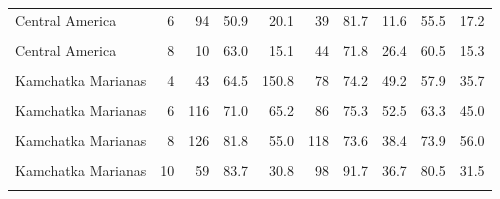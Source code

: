 \begin{ThreePartTable}
\begin{longtable}[t]{lrrrrrrrrr}
Central America & 6 & 94 & 50.9 & 20.1 & 39 & 81.7 & 11.6 & 55.5 & 17.2\\
\cellcolor{gray!6}{Central America} & \cellcolor{gray!6}{7} & \cellcolor{gray!6}{2} & \cellcolor{gray!6}{76.4} & \cellcolor{gray!6}{11.5} & \cellcolor{gray!6}{48} & \cellcolor{gray!6}{81.5} & \cellcolor{gray!6}{11.1} & \cellcolor{gray!6}{65.0} & \cellcolor{gray!6}{9.8}\\
Central America & 8 & 10 & 63.0 & 15.1 & 44 & 71.8 & 26.4 & 60.5 & 15.3\\
\cellcolor{gray!6}{Kamchatka Marianas} & \cellcolor{gray!6}{3} & \cellcolor{gray!6}{25} & \cellcolor{gray!6}{186.0} & \cellcolor{gray!6}{112.0} & \cellcolor{gray!6}{81} & \cellcolor{gray!6}{70.4} & \cellcolor{gray!6}{44.1} & \cellcolor{gray!6}{53.3} & \cellcolor{gray!6}{46.4}\\
Kamchatka Marianas & 4 & 43 & 64.5 & 150.8 & 78 & 74.2 & 49.2 & 57.9 & 35.7\\
\cellcolor{gray!6}{Kamchatka Marianas} & \cellcolor{gray!6}{5} & \cellcolor{gray!6}{79} & \cellcolor{gray!6}{54.0} & \cellcolor{gray!6}{64.5} & \cellcolor{gray!6}{123} & \cellcolor{gray!6}{95.4} & \cellcolor{gray!6}{46.2} & \cellcolor{gray!6}{91.3} & \cellcolor{gray!6}{53.2}\\
Kamchatka Marianas & 6 & 116 & 71.0 & 65.2 & 86 & 75.3 & 52.5 & 63.3 & 45.0\\
\cellcolor{gray!6}{Kamchatka Marianas} & \cellcolor{gray!6}{7} & \cellcolor{gray!6}{302} & \cellcolor{gray!6}{74.8} & \cellcolor{gray!6}{49.8} & \cellcolor{gray!6}{113} & \cellcolor{gray!6}{78.6} & \cellcolor{gray!6}{43.3} & \cellcolor{gray!6}{72.8} & \cellcolor{gray!6}{37.3}\\
Kamchatka Marianas & 8 & 126 & 81.8 & 55.0 & 118 & 73.6 & 38.4 & 73.9 & 56.0\\
\cellcolor{gray!6}{Kamchatka Marianas} & \cellcolor{gray!6}{9} & \cellcolor{gray!6}{172} & \cellcolor{gray!6}{89.0} & \cellcolor{gray!6}{82.8} & \cellcolor{gray!6}{153} & \cellcolor{gray!6}{76.0} & \cellcolor{gray!6}{61.0} & \cellcolor{gray!6}{70.9} & \cellcolor{gray!6}{56.9}\\
Kamchatka Marianas & 10 & 59 & 83.7 & 30.8 & 98 & 91.7 & 36.7 & 80.5 & 31.5\\
\cellcolor{gray!6}{Kamchatka Marianas} & \cellcolor{gray!6}{11} & \cellcolor{gray!6}{27} & \cellcolor{gray!6}{80.0} & \cellcolor{gray!6}{39.8} & \cellcolor{gray!6}{94} & \cellcolor{gray!6}{83.7} & \cellcolor{gray!6}{30.6} & \cellcolor{gray!6}{67.9} & \cellcolor{gray!6}{32.8}\\

\end{longtable}
\end{ThreePartTable}
